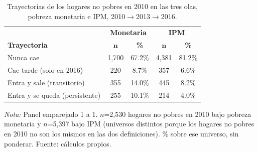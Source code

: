 \begin{table}[H]
  \centering
  \caption{Trayectorias de los hogares no pobres en 2010 en las tres
  olas, pobreza monetaria e IPM, 2010$\to$2013$\to$2016.}
  \label{tab:trayectorias_3olas}
  \footnotesize
  \begin{tabular}{lcccc}
    \toprule
    & \multicolumn{2}{c}{\textbf{Monetaria}} & \multicolumn{2}{c}{\textbf{IPM}} \\
    \textbf{Trayectoria} & $\boldsymbol{n}$ & \textbf{\%} & $\boldsymbol{n}$ & \textbf{\%} \\
    \midrule
    Nunca cae & 1{,}700 & 67.2\% & 4{,}381 & 81.2\% \\
    Cae tarde (solo en 2016) & 220 & 8.7\% & 357 & 6.6\% \\
    Entra y sale (transitorio) & 355 & 14.0\% & 445 & 8.2\% \\
    Entra y se queda (persistente) & 255 & 10.1\% & 214 & 4.0\% \\
    \bottomrule
  \end{tabular}
  \begin{minipage}{0.85\textwidth}
    \vspace{4pt}
    \footnotesize \textit{Nota:} Panel emparejado 1 a 1. $n$=2{,}530 hogares no pobres en 2010 bajo
    pobreza monetaria y $n$=5{,}397 bajo IPM (universos distintos porque
    los hogares no pobres en 2010 no son los mismos en las dos
    definiciones). \% sobre ese universo, sin ponderar. Fuente: cálculos propios.
  \end{minipage}
\end{table}